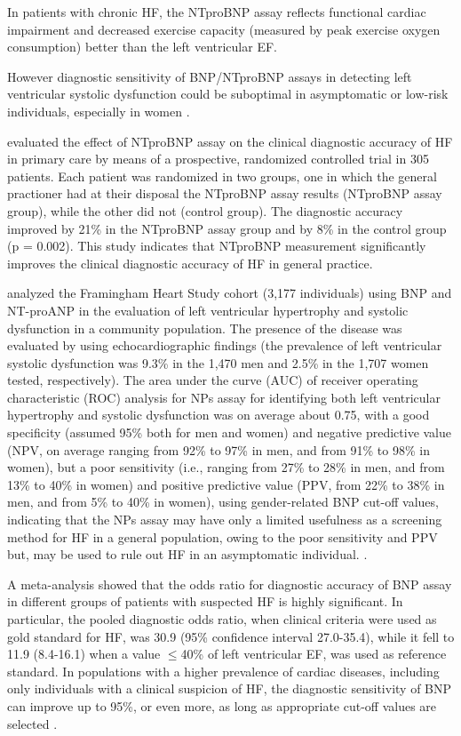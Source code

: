 \documentclass[14pt,a4paper,onecolumn]{extarticle}
\begin{document}
In patients with chronic HF, the NTproBNP assay reflects functional cardiac impairment and decreased exercise capacity (measured by peak exercise oxygen consumption) better than the left ventricular EF. \citep{bib375}

However diagnostic sensitivity of BNP/NTproBNP assays in detecting left ventricular systolic dysfunction could be suboptimal in asymptomatic or low-risk individuals, especially in women \citep{bib39}.

\citep{bib3133} evaluated the effect of NTproBNP assay on the clinical diagnostic accuracy of HF in primary care by means of a prospective, randomized controlled trial in 305 patients. Each patient was randomized in two groups, one in which the general practioner had at their disposal the NTproBNP assay results (NTproBNP assay group), while the other did not (control group). The diagnostic accuracy improved by 21\% in the NTproBNP assay group and by 8\% in the control group (p = 0.002). This study indicates that NTproBNP measurement significantly improves the clinical diagnostic accuracy of HF in general practice.

\citep{bib39} analyzed the Framingham Heart Study cohort (3,177 individuals) using BNP and NT-proANP in the evaluation of left ventricular hypertrophy and systolic dysfunction in a community population.  The presence of the disease was evaluated by using echocardiographic findings (the prevalence of left ventricular systolic dysfunction was 9.3\% in the 1,470 men and 2.5\% in the 1,707 women tested, respectively). The area under the curve (AUC) of receiver operating characteristic (ROC) analysis for NPs assay for identifying both left ventricular hypertrophy and systolic dysfunction was on average about 0.75, with a good specificity (assumed 95\% both for men and women) and negative predictive value (NPV, on average ranging from 92\% to 97\% in men, and from 91\% to 98\% in women), but a poor sensitivity (i.e., ranging from 27\% to 28\% in men, and from 13\% to 40\% in women) and positive predictive value (PPV, from 22\% to 38\% in men, and from 5\% to 40\% in women), using gender-related BNP cut-off values, indicating that the NPs assay may have only a limited usefulness as a screening method for HF in a general population, owing to the poor sensitivity and PPV but, may be used to rule out HF in an asymptomatic individual.
 \citep{bib39}.

 A meta-analysis showed that the odds ratio for diagnostic accuracy of BNP assay in different groups of patients with suspected HF is highly significant. In particular, the pooled diagnostic odds ratio, when clinical criteria were used as gold standard for HF, was 30.9 (95\% confidence interval 27.0-35.4), while it fell to 11.9 (8.4-16.1) when a value $\leq$40\% of left ventricular EF, was used as reference standard.  In populations with a higher prevalence of cardiac diseases, including only individuals with a clinical suspicion of HF, the diagnostic sensitivity of BNP can improve up to 95\%, or even more, as long as appropriate cut-off values are selected \citep{bib372}.
\end{document}

